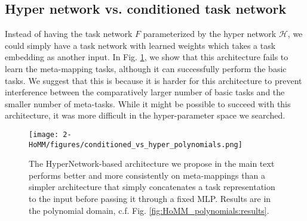 \subsection{Hyper network vs. conditioned task network} \label{app_lesion_results_hyper}
Instead of having the task network $F$ parameterized by the hyper network $\mathcal{H}$, we could simply have a task network with learned weights which takes a task embedding as another input. In Fig. \ref{supp_fig:HoMM_arch_cond_vs_hyper}, we show that this architecture fails to learn the meta-mapping tasks, although it can successfully perform the basic tasks. We suggest that this is because it is harder for this architecture to prevent interference between the comparatively larger number of basic tasks and the smaller number of meta-tasks. While it might be possible to succeed with this architecture, it was more difficult in the hyper-parameter space we searched.\par 

\begin{figure}[H]
\centering
\texttt{[image: 2-HoMM/figures/conditioned\_vs\_hyper\_polynomials.png]}
\caption[The HyperNetwork-based architecture we propose outperforms a simpler architecture.]{The HyperNetwork-based architecture we propose in the main text performs better and more consistently on meta-mappings than a simpler architecture that simply concatenates a task representation to the input before passing it through a fixed MLP. Results are in the polynomial domain, c.f. Fig. \ref{fig:HoMM_polynomials:results}.}\label{supp_fig:HoMM_arch_cond_vs_hyper}
\end{figure}

